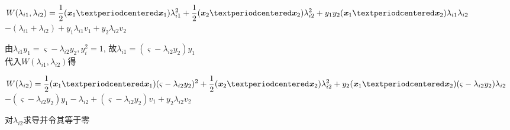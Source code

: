 \documentclass[UTF8]{ctexart}
\begin{document}
\begin{center}

    $\displaystyle{
            W(\lambda_{i1},\lambda_{i2})=
            \frac{1}{2}(\textbf{\emph{x}}_1·\textbf{\emph{x}}_1)
            \lambda_{i1}^2
            +
            \frac{1}{2}(\textbf{\emph{x}}_2·\textbf{\emph{x}}_2)
            \lambda_{i2}^2
            +
            y_1 y_2 (\textbf{\emph{x}}_1·\textbf{\emph{x}}_2)
            \lambda_{i1}\lambda_{i2}}$
    \\
    $\displaystyle{-
            (\lambda_{i1}+\lambda_{i2})
            +
            y_1 \lambda_{i1} v_1
            +
            y_2 \lambda_{i2} v_2
        }$

\end{center}

由$\lambda_{i1} y_1=\varsigma -\lambda_{i2} y_2,y_i^2=1$,
故$\lambda _{i1}=(\varsigma-\lambda_{i2} y_2)y_1$
\\
代入$ W(\lambda_{i1},\lambda_{i2})$得

\begin{center}

    $\displaystyle{
            W(\lambda_{i2})=
            \frac{1}{2}(\textbf{\emph{x}}_1·\textbf{\emph{x}}_1)
            (\varsigma-\lambda_{i2} y_2)^2
            +
            \frac{1}{2}(\textbf{\emph{x}}_2·\textbf{\emph{x}}_2)
            \lambda_{i2}^2
            +
            y_2 (\textbf{\emph{x}}_1·\textbf{\emph{x}}_2)
            (\varsigma-\lambda_{i2} y_2)\lambda_{i2}}$
    \\
    $\displaystyle{-
            (\varsigma-\lambda_{i2} y_2)y_1
            -
            \lambda_{i2}
            +
            (\varsigma-\lambda_{i2} y_2) v_1
            +
            y_2 \lambda_{i2} v_2
        }$

\end{center}

对$\lambda_{i2}$求导并令其等于零
\end{document}
